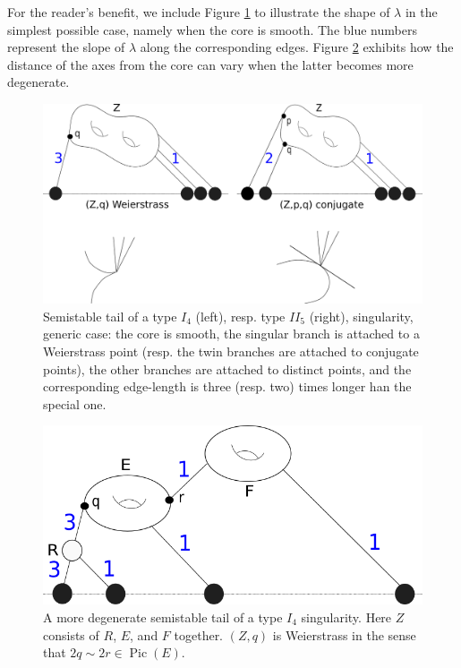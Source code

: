 \documentclass{compositio}
\theoremstyle{plain}
\theoremstyle{definition}
\theoremstyle{remark}
\begin{document}
 
  For the reader's benefit, we include Figure \ref{fig:adm_fun_smooth_core} to illustrate the shape of $\lambda$ in the simplest possible case, namely when the core is smooth. The blue numbers represent the slope of $\lambda$ along the corresponding edges. Figure \ref{fig:adm_fun_reducible_core} exhibits how the distance of the axes from the core can vary when the latter becomes more degenerate.
 
 \begin{center}
  \begin{figure}[htb]
  \includegraphics[width=\textwidth]{irreducible_core}
  \caption{Semistable tail of a type $I_4$ (left), resp. type $I\!I_5$ (right), singularity, generic case: the core is smooth, the singular branch is attached to a Weierstrass point (resp. the twin branches are attached to conjugate points), the other branches are attached to distinct points, and the corresponding edge-length is three (resp. two) times longer han the special one.}
  \label{fig:adm_fun_smooth_core}
 \end{figure}
 \end{center}
 
  \begin{center}
  \begin{figure}[h]
  \includegraphics[width=\textwidth]{reducible_core}
  \caption{A more degenerate semistable tail of a type $I_4$ singularity. Here $Z$ consists of $R$, $E$, and $F$ together. $(Z,q)$ is Weierstrass in the sense that $2q\sim 2r\in\operatorname{Pic}(E)$.}
  \label{fig:adm_fun_reducible_core}
 \end{figure}
 \end{center}
\end{document}
